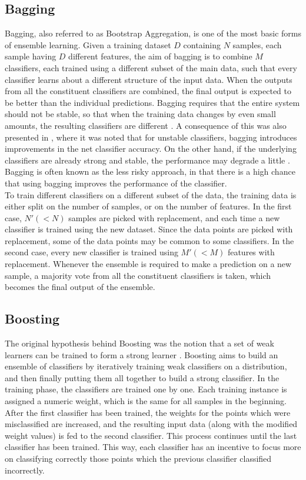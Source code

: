 \subsection{Bagging}
Bagging, also referred to as Bootstrap Aggregation, is one of the most basic forms of ensemble learning. Given a training dataset $D$ containing $N$ samples, each sample having $D$ different features, the aim of bagging is to combine $M$ classifiers, each trained using a different subset of the main data, such that every classifier learns about a different structure of the input data. When the outputs from all the constituent classifiers are combined, the final output is expected to be better than the individual predictions. Bagging requires that the entire system should not be stable, so that when the training data changes by even small amounts, the resulting classifiers are different \cite{quinlan1996bagging}. A consequence of this was also presented in \cite{breiman1996bagging}, where it was noted that for unstable classifiers, bagging introduces improvements in the net classifier accuracy. On the other hand, if the underlying classifiers are already strong and stable, the performance may degrade a little \cite{breiman1996bagging}. Bagging is often known as the less risky approach, in that there is a high chance that using bagging improves the performance of the classifier.\\

To train different classifiers on a different subset of the data, the training data is either split on the number of samples, or on the number of features. In the first case, $N' (< N)$ samples are picked with replacement, and each time a new classifier is trained using the new dataset. Since the data points are picked with replacement, some of the data points may be common to some classifiers. In the second case, every new classifier is trained using $M' (< M)$ features with replacement. Whenever the ensemble is required to make a prediction on a new sample, a majority vote from all the constituent classifiers is taken, which becomes the final output of the ensemble.

\subsection{Boosting}
The original hypothesis behind Boosting was the notion that a set of weak learners can be trained to form a strong learner \cite{kearns1988thoughts}. Boosting aims to build an ensemble of classifiers by iteratively training weak classifiers on a distribution, and then finally putting them all together to build a strong classifier. In the training phase, the classifiers are trained one by one. Each training instance is assigned a numeric weight, which is the same for all samples in the beginning. After the first classifier has been trained, the weights for the points which were misclassified are increased, and the resulting input data (along with the modified weight values) is fed to the second classifier. This process continues until the last classifier has been trained. This way, each classifier has an incentive to focus more on classifying correctly those points which the previous classifier classified incorrectly.\\

